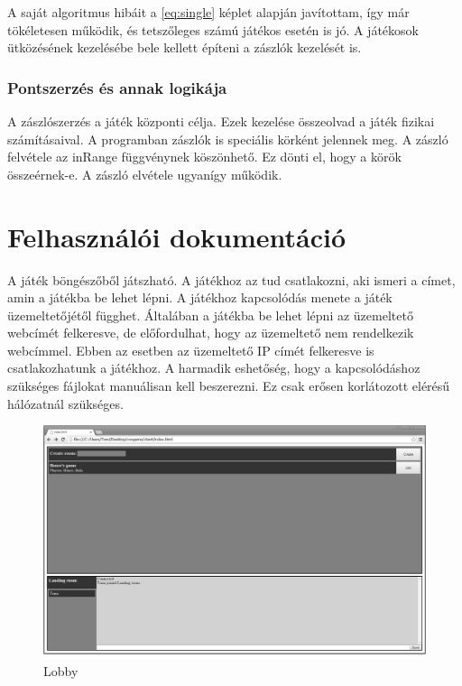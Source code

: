 \documentclass[bibliography=totocnumbered]{article}
\begin{document}
A saját algoritmus hibáit a \ref{eq:single} képlet alapján javítottam, így már tökéletesen
működik, és tetszőleges számú játékos esetén is jó. A játékosok
ütközésének kezelésébe bele kellett építeni a zászlók kezelését is.


\subsubsection{Pontszerzés és annak
logikája}

A zászlószerzés a játék központi célja. Ezek kezelése összeolvad a játék
fizikai számításaival. A programban zászlók is speciális körként
jelennek meg. A zászló felvétele az inRange függvénynek köszönhető. Ez
dönti el, hogy a körök összeérnek-e. A zászló elvétele ugyanígy működik.


\section{Felhasználói
dokumentáció}

A játék böngészőből játszható. A játékhoz az tud csatlakozni, aki ismeri
a címet, amin a játékba be lehet lépni. A játékhoz kapcsolódás menete a
játék üzemeltetőjétől függhet. Általában a játékba be lehet lépni az
üzemeltető webcímét felkeresve, de előfordulhat, hogy az üzemeltető nem
rendelkezik webcímmel. Ebben az esetben az üzemeltető IP címét
felkeresve is csatlakozhatunk a játékhoz. A harmadik eshetőség, hogy a
kapcsolódáshoz szükséges fájlokat manuálisan kell beszerezni. Ez csak
erősen korlátozott elérésű hálózatnál szükséges.


\begin{figure}[ht]
	\caption{Lobby}
	\label{lobby}
	\includegraphics[scale=0.29]{media/image10.png}
\end{figure}
\end{document}
